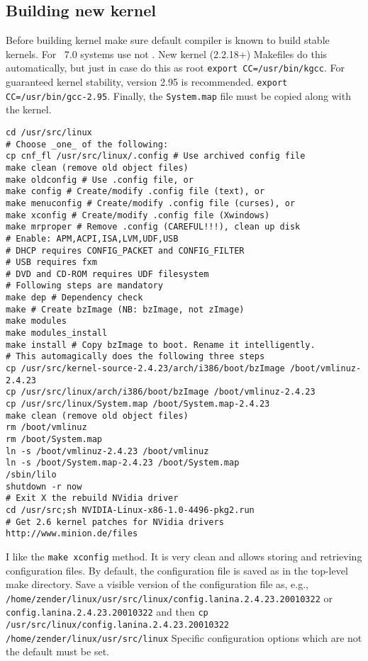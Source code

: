 \documentclass[12pt,twoside]{article}
\begin{document}
\subsection{Building new kernel}\label{sxn:krn}
Before building kernel make sure default compiler is known to build
stable kernels.
For ~7.0 systems use  not .
New kernel (2.2.18+) Makefiles do this automatically, but just in case
do this as root \verb'export CC=/usr/bin/kgcc'. 
For guaranteed kernel stability,  version 2.95 is recommended.
\verb'export CC=/usr/bin/gcc-2.95'. 
Finally, the \verb'System.map' file must be copied along with the
kernel.  
\begin{verbatim}
cd /usr/src/linux
# Choose _one_ of the following:
cp cnf_fl /usr/src/linux/.config # Use archived config file
make clean (remove old object files)
make oldconfig # Use .config file, or 
make config # Create/modify .config file (text), or
make menuconfig # Create/modify .config file (curses), or
make xconfig # Create/modify .config file (Xwindows)
make mrproper # Remove .config (CAREFUL!!!), clean up disk
# Enable: APM,ACPI,ISA,LVM,UDF,USB
# DHCP requires CONFIG_PACKET and CONFIG_FILTER
# USB requires fxm
# DVD and CD-ROM requires UDF filesystem
# Following steps are mandatory
make dep # Dependency check
make # Create bzImage (NB: bzImage, not zImage)
make modules
make modules_install
make install # Copy bzImage to boot. Rename it intelligently.
# This automagically does the following three steps
cp /usr/src/kernel-source-2.4.23/arch/i386/boot/bzImage /boot/vmlinuz-2.4.23
cp /usr/src/linux/arch/i386/boot/bzImage /boot/vmlinuz-2.4.23
cp /usr/src/linux/System.map /boot/System.map-2.4.23
make clean (remove old object files)
rm /boot/vmlinuz
rm /boot/System.map
ln -s /boot/vmlinuz-2.4.23 /boot/vmlinuz
ln -s /boot/System.map-2.4.23 /boot/System.map
/sbin/lilo
shutdown -r now
# Exit X the rebuild NVidia driver
cd /usr/src;sh NVIDIA-Linux-x86-1.0-4496-pkg2.run
# Get 2.6 kernel patches for NVidia drivers
http://www.minion.de/files
\end{verbatim}
I like the \verb'make xconfig' method.
It is very clean and allows storing and retrieving configuration files.
By default, the configuration file is saved as  in the
top-level make directory.
Save a visible version of the configuration file as, e.g.,
\verb'/home/zender/linux/usr/src/linux/config.lanina.2.4.23.20010322'
or \verb'config.lanina.2.4.23.20010322' and then
\verb'cp /usr/src/linux/config.lanina.2.4.23.20010322 /home/zender/linux/usr/src/linux'
Specific configuration options which are not the default must be set.
\end{document}
